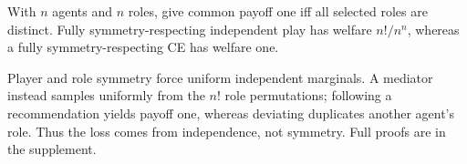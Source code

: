 \begin{proposition}
\label{prop:role-correlation}
With $n$ agents and $n$ roles, give common payoff one iff all selected roles are distinct.  Fully symmetry-respecting independent play has welfare $n!/n^n$, whereas a fully symmetry-respecting CE has welfare one.
\end{proposition}
Player and role symmetry force uniform independent marginals.  A mediator instead samples uniformly from the $n!$ role permutations; following a recommendation yields payoff one, whereas deviating duplicates another agent's role.  Thus the loss comes from independence, not symmetry.  Full proofs are in the supplement.
